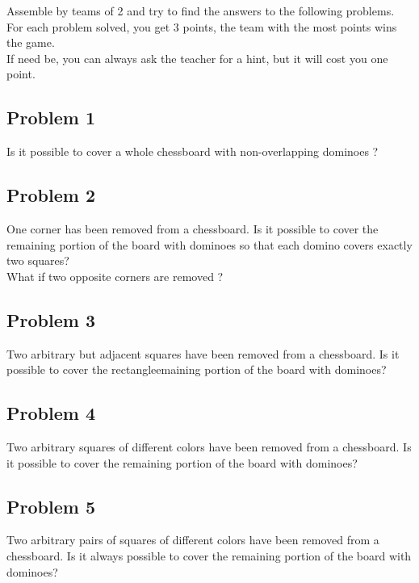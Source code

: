 \documentclass[12pt,a4paper,article,english,firamath]{nsi}
\begin{document}
\maketitle
Assemble by teams of 2 and try to find the answers to the following problems.\\ For each problem solved, you get 3 points, the team with the most points wins the game.\\

If need be, you can always ask the teacher for a hint, but it will cost you one point.


\subsection*{Problem 1}

Is it possible to cover a whole chessboard with non-overlapping dominoes ? 

\subsection*{Problem 2}

One corner has been removed from a chessboard. Is it possible to cover the remaining portion of the board with dominoes so that each domino covers exactly two squares?\\
What if two opposite corners are removed ?

\subsection*{Problem 3}

Two arbitrary but adjacent squares have been removed from a chessboard. Is it possible to cover the rectangleemaining portion of the board with dominoes?

\subsection*{Problem 4}

Two arbitrary squares of different colors have been removed from a chessboard. Is it possible to cover the remaining portion of the board with dominoes?

\subsection*{Problem 5}

Two arbitrary pairs of squares of different colors have been removed from a chessboard. Is it always possible to cover the remaining portion of the board with dominoes?
\end{document}
